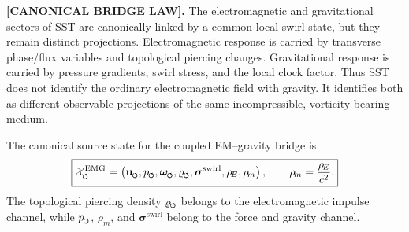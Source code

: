 \documentclass[11pt]{article}
\theoremstyle{definition}
\theoremstyle{plain}
\theoremstyle{remark}
\newcommand{\swirlarrow}{\mathchoice{\mkern-2mu\scriptstyle\boldsymbol{\circlearrowleft}}{\mkern-2mu\scriptstyle\boldsymbol{\circlearrowleft}}{\mkern-2mu\scriptscriptstyle\boldsymbol{\circlearrowleft}}{\mkern-2mu\scriptscriptstyle\boldsymbol{\circlearrowleft}}}
\newcommand{\rhoE}{\rho_{\!E}}
\newcommand{\rhoM}{\rho_{\!m}}
\begin{document}
        \textbf{[CANONICAL BRIDGE LAW].} The electromagnetic and gravitational sectors of SST are canonically linked by a common local swirl state, but they remain distinct projections. Electromagnetic response is carried by transverse phase/flux variables and topological piercing changes. Gravitational response is carried by pressure gradients, swirl stress, and the local clock factor. Thus SST does not identify the ordinary electromagnetic field with gravity. It identifies both as different observable projections of the same incompressible, vorticity-bearing medium.

        The canonical source state for the coupled EM--gravity bridge is
        \begin{align}
            \boxed{
            \mathcal{X}^{\mathrm{EMG}}_{\swirlarrow}
            =
            \left(
            \mathbf{u}_{\swirlarrow},
            p_{\swirlarrow},
            \boldsymbol{\omega}_{\swirlarrow},
            \varrho_{\swirlarrow},
            \boldsymbol{\sigma}^{\mathrm{swirl}},
            \rhoE,
            \rhoM
            \right),
            \qquad
            \rhoM=\frac{\rhoE}{c^2}.
            }
            \label{eq:emg_source_state}
        \end{align}
        The topological piercing density \(\varrho_{\swirlarrow}\) belongs to the electromagnetic impulse channel, while \(p_{\swirlarrow}\), \(\rhoM\), and \(\boldsymbol{\sigma}^{\mathrm{swirl}}\) belong to the force and gravity channel.
\end{document}
